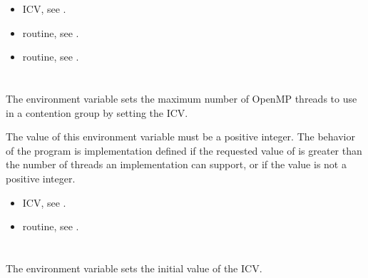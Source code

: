 \crossreferences
\begin{itemize}
\item {} ICV, see .

\item {} routine, see .

\item {} routine, see .
\end{itemize}










\section{}
\label{sec:OMP_THREAD_LIMIT}
The  environment variable sets the maximum number of OpenMP threads to use in a contention group by setting the  ICV. 

The value of this environment variable must be a positive integer. The behavior of the 
program is implementation defined if the requested value of  is 
greater than the number of threads an implementation can support, or if the value is not 
a positive integer. 

\crossreferences
\begin{itemize}
\item {} ICV, see .

\item {} routine, see .
\end{itemize}









\section{}
\label{sec:OMP_CANCELLATION}
The  environment variable sets the initial value of the  
ICV.

